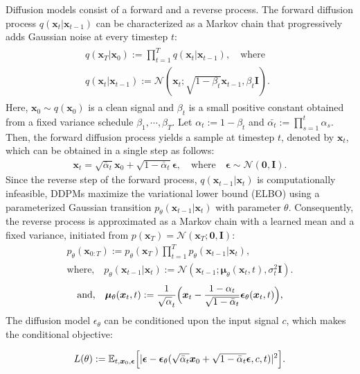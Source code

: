 \documentclass[letterpaper]{article} %
\newcommand{\x}{{\boldsymbol x}}
\newcommand{\Ib}{{\boldsymbol I}}
\newcommand{\Nc}{{\mathcal N}}
\begin{document}
Diffusion models \cite{sohl2015deep} consist of a forward and a reverse process.
The forward diffusion process $q(\x_t|\x_{t-1})$
can be characterized as a Markov chain that progressively adds Gaussian noise at every timestep $t$:
\begin{align}
\label{eq:forward-ddpm}
\begin{split}q(\x_{T}|\x_0):=\prod_{t=1}^{T}q(\x_t|\x_{t-1}),\quad \mbox{where}\quad \\
    q(\x_t|\x_{t-1}):=\Nc(\x_t;\sqrt{1-\beta_t}\x_{t-1},\beta_t\Ib).
\end{split}
\end{align}
Here, $\x_0 \sim q(\x_0)$ is a clean signal and $\beta_t$ is a small positive constant obtained from a fixed variance schedule $\beta_1, \cdots, \beta_T$.
Let $\alpha_t := 1 - \beta_t$ and $\bar{\alpha_t} := \prod_{s=1}^t \alpha_s$. Then, the forward diffusion process yields a sample at timestep $t$, denoted by $\x_t$, which can be obtained in a single step as follows:
\begin{align}
\label{eq:ddpm}
\x_t=\sqrt{\bar{\alpha}_t}\x_0+\sqrt{1-\bar{\alpha}_t}\boldsymbol{\epsilon},\quad \mbox{where}\quad \boldsymbol{\epsilon}\sim\Nc(\textbf{0},\Ib).
\end{align}
Since the reverse step of the forward process, $q(\x_{t-1}|\x_t)$ is computationally infeasible, DDPMs \cite{ho2020denoising} maximize the variational lower bound (ELBO) using a parameterized Gaussian transition $p_\theta(\x_{t-1}|\x_t)$ with parameter $\theta$. Consequently, the reverse process is approximated as a Markov chain with a learned mean and a fixed variance, initiated from $p(\x_T) = \mathcal{N}(\x_T; \textbf{0}, \boldsymbol{I})$:
\begin{align}
p_\theta(\x_{0:T}):=p_\theta(\x_T)\prod_{t=1}^{T}p_\theta(\x_{t-1}|\x_{t}),\quad \\ \mbox{where,}\quad
p_\theta(\x_{t-1}|\x_{t}):=\Nc(\x_{t-1};{\boldsymbol\mu}_\theta(\x_t,t),\sigma_t^2\Ib).
\end{align}
\begin{align}\label{eq:mu}
\mbox{and,}\quad
{\boldsymbol\mu}_\theta(\x_t,t):=\frac{1}{\sqrt{\alpha}_t}\Big{(}\x_t-\frac{1-\alpha_t}{\sqrt{1-\bar{\alpha}_t}}\boldsymbol{\epsilon}_\theta(\x_t,t)\Big{)},
\end{align}
The diffusion model $\epsilon_{\theta}$ can be conditioned upon the input signal $c$, which makes the conditional objective:

\begin{align}
\label{eq:cond-objective}
 L(\theta):=\mathbb{E}_{t,\x_0,\boldsymbol{\epsilon}}\Big{[}|\boldsymbol{\epsilon}-\boldsymbol{\epsilon}_\theta(\sqrt{\bar{\alpha}_t}\x_0+\sqrt{1-\bar{\alpha}_t}\boldsymbol{\epsilon},c, t)|^2\Big{]}.
\end{align}
\end{document}
